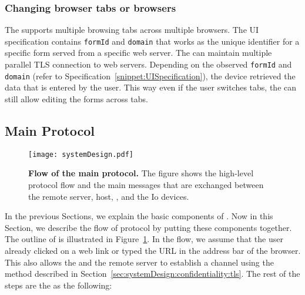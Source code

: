 \subsubsection{Changing browser tabs or browsers}
The \device supports multiple browsing tabs across multiple browsers. The UI specification contains \texttt{formId} and \texttt{domain} that works as the unique identifier for a specific form served from a specific web server. The \device can maintain multiple parallel TLS connection to web servers. Depending on the observed \texttt{formId} and \texttt{domain} (refer to Specification~\ref{snippet:UISpecification}), the device retrieved the data that is entered by the user. This way even if the user switches tabs, the \device can still allow editing the forms across tabs.


\subsection{Main Protocol}
\label{sec:systemDesign:mainProtocol}

\begin{figure}[t]
\centering
\texttt{[image: systemDesign.pdf]}
\caption{\textbf{Flow of the \name main protocol.} The figure shows the high-level protocol flow and the main messages that are exchanged between the remote server, host, \device, and the Io devices.}
\spacesave
\label{fig:systemDesign}
\centering
\end{figure}


In the previous Sections, we explain the basic components of \name. Now in this Section, we describe the flow of \name protocol by putting these components together. The outline of \name is illustrated in Figure~\ref{fig:systemDesign}. In the flow, we assume that the user already clicked on a web link or typed the URL in the address bar of the browser. This also allows the \device and the remote server to establish a \tls channel using the method described in Section~\ref{sec:systemDesign:confidentiality:tls}. The rest of the steps are the as the following:


